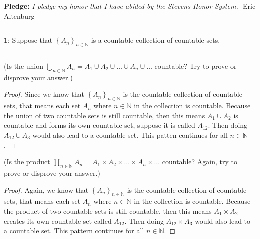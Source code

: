 \documentclass[11pt]{article}
\newcommand\question[2]{\vspace{.25in}\hrule\textbf{#1}: #2\vspace{.5em}\hrule\vspace{.10in}}
\renewcommand\part[1]{\vspace{.10in}(#1)\par}
\newcommand{\N}{\mathbb{N}}
\begin{document}
\raggedright
\newcommand\NAME{Eric Altenburg}  %
\newcommand\COURSE{MA-240}
\newcommand\HWNUM{11}              %


\textbf{Pledge:} \textit{I pledge my honor that I have abided by the Stevens Honor System.} -Eric Altenburg

\question{1}{Suppose that $\left\{A_n\right\}_{n\in\N}$ is a countable collection of countable sets.}

\part{Is the union $\bigcup_{n\in\mathbb{N}}A_n=A_1\cup A_2\cup\ldots\cup A_n\cup\ldots$ countable? Try to prove or disprove your answer.}

\begin{proof}
	Since we know that $\left\{A_n\right\}_{n\in\N}$ is the countable collection of countable sets, that means each set $A_n$ where $n \in \N$ in the collection is countable. Because the union of two countable sets is still countable, then this means $A_1 \cup A_2$ is countable and forms its own countable set, suppose it is called $A_12$. Then doing $A_12 \cup A_3$ would also lead to a countable set. This patten continues for all $n \in \N$.
\end{proof}

\part{Is the product $\prod_{n\in\mathbb{N}}A_n=A_1\times A_2\times\ldots\times A_n\times\ldots$ countable? Again, try to prove or disprove your answer.}

\begin{proof}
	Again, we know that $\left\{A_n\right\}_{n\in\N}$ is the countable collection of countable sets, that means each set $A_n$ where $n \in \N$ in the collection is countable. Because the product of two countable sets is still countable, then this means $A_1 \times A_2$ creates its own countable set called $A_12$. Then doing $A_12 \times A_3$ would also lead to a countable set. This pattern continues for all $n \in \N$.
\end{proof}
\end{document}
